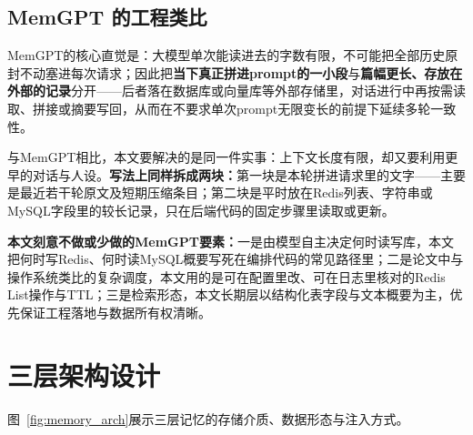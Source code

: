 \documentclass{base}
\begin{document}
\subsection{MemGPT 的工程类比}

MemGPT的核心直觉是：大模型单次能读进去的字数有限，不可能把全部历史原封不动塞进每次请求；因此把\textbf{当下真正拼进prompt的一小段}与\textbf{篇幅更长、存放在外部的记录}分开——后者落在数据库或向量库等外部存储里，对话进行中再按需读取、拼接或摘要写回，从而在不要求单次prompt无限变长的前提下延续多轮一致性\cite{MemGPT2023}。

与MemGPT相比，本文要解决的是同一件实事：上下文长度有限，却又要利用更早的对话与人设。\textbf{写法上同样拆成两块：}第一块是本轮拼进请求里的文字——主要是最近若干轮原文及短期压缩条目；第二块是平时放在Redis列表、字符串或MySQL字段里的较长记录，只在后端代码的固定步骤里读取或更新。

\textbf{本文刻意不做或少做的MemGPT要素：}一是由模型自主决定何时读写库，本文把何时写Redis、何时读MySQL概要写死在编排代码的常见路径里；二是论文中与操作系统类比的复杂调度，本文用的是可在配置里改、可在日志里核对的Redis List操作与TTL；三是检索形态，本文长期层以结构化表字段与文本概要为主，优先保证工程落地与数据所有权清晰。

\section{三层架构设计}\label{sec:memgptrelation}

图~\ref{fig:memory_arch}展示三层记忆的存储介质、数据形态与注入方式。
\end{document}
